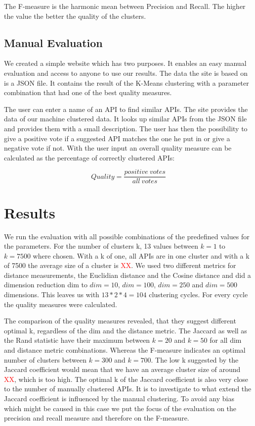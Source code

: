 \documentclass[a4paper]{IEEEtran}
\begin{document}
The F-measure is the harmonic mean between Precision and Recall. The higher the value the better the quality of the clusters.

\subsection{Manual Evaluation}
We created a simple website which has two purposes. It enables an easy manual evaluation and access to anyone to use our results. The data the site is based on is a JSON file. It contains the result of the K-Means clustering with a parameter combination that had one of the best quality measures.

The user can enter a name of an API to find similar APIs. The site provides the data of our machine clustered data. It looks up similar APIs from the JSON file and provides them with a small description. The user has then the possibility to give a positive vote if a suggested API matches the one he put in or give a negative vote if not.
With the user input an overall quality measure can be calculated as the percentage of correctly clustered APIs:

\begin{equation*}
Quality= \frac{positive~votes}{all~votes}
\end{equation*}

\section{Results}
We run the evaluation with all possible combinations of the predefined values for the parameters. For the number of clusters k, 13 values between $k=1$ to $k=7500$ where chosen. With a k of one, all APIs are in one cluster and with a k of 7500 the average size of a cluster is \textcolor{red} {XX}. We used two different metrics for distance measurements, the Euclidian distance and the Cosine distance and did a dimension reduction dim to $dim⁡= 10$, $dim⁡= 100$, $dim⁡=  250$ and  $dim⁡= 500$ dimensions. This leaves us with $13*2*4=104$ clustering cycles. For every cycle the quality measures were calculated.

The comparison of the quality measures revealed, that they suggest different optimal k, regardless of the dim and the distance metric. The Jaccard as well as the Rand statistic have their maximum between $k=20$ and $k=50$ for all dim and distance metric combinations. Whereas the F-measure indicates an optimal number of clusters between $k=300$ and $k=700$.
The low k suggested by the Jaccard coefficient would mean that we have an average cluster size of around \textcolor{red} {XX}, which is too high. The optimal k of the Jaccard coefficient is also very close to the number of manually clustered APIs. It is to investigate to what extend the Jaccard coefficient is influenced by the manual clustering. To avoid any bias which might be caused in this case we put the focus of the evaluation on the precision and recall measure and therefore on the F-measure.
\end{document}
